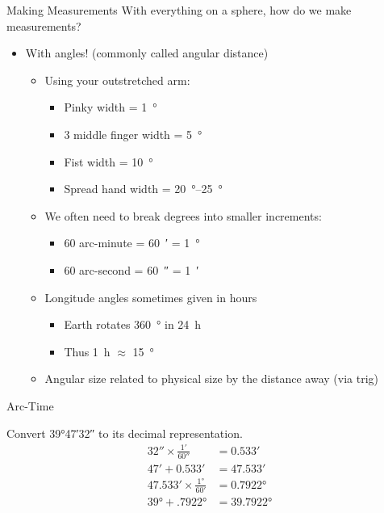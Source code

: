 \documentclass[pdf, aspectratio=169]{beamer}
\begin{document}
\begin{frame}{Making Measurements}
  With everything on a sphere, how do we make measurements?\pause
  \begin{itemize}
	\item With angles! (commonly called \alert{angular distance})
	  \begin{itemize}
		\item Using your outstretched arm:
		  \begin{itemize}
			\item Pinky width = \SI{1}{\degree}
			\item 3 middle finger width = \SI{5}{\degree}
			\item Fist width = \SI{10}{\degree}
			\item Spread hand width = \SIrange{20}{25}{\degree}
		  \end{itemize}
		\item We often need to break degrees into smaller increments:
		  \begin{itemize}
			\item 60 arc-minute = \SI{60}{\arcminute} = \SI{1}{\degree}
			\item 60 arc-second = \SI{60}{\arcsecond} = \SI{1}{\arcminute}
		  \end{itemize}
		\item Longitude angles sometimes given in hours
		  \begin{itemize}
			\item Earth rotates \SI{360}{\degree} in \SI{24}{\hour}
			\item Thus \SI{1}{\hour} $\approx$ \SI{15}{\degree}
		  \end{itemize}
		\item Angular size related to physical size by the distance away (via trig)
	  \end{itemize}
  \end{itemize}
\end{frame}

\begin{frame}{Arc-Time}
	\begin{example}
		Convert \ang{39;47;32} to its decimal representation.
		\pause
		\begin{align*}
			\ang{;;32} \times \frac{\ang{;1;}}{\ang{;;60}} &= \ang{;0.533;}\\
			\ang{;47;} + \ang{;0.533;} &= \ang{;47.533;} \\
			\ang{;47.533;} \times \frac{\ang{1}}{\ang{;60;}} &= \ang{0.7922}\\
			\ang{39} + \ang{.7922} &= \ang{39.7922}
		\end{align*}
	\end{example}
\end{frame}
\end{document}
